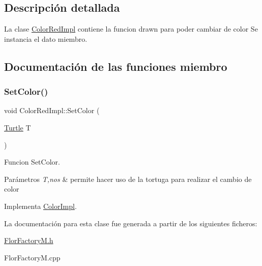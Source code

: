 \subsection{Descripción detallada}
La clase \hyperlink{classColorRedImpl}{Color\+Red\+Impl} contiene la funcion drawn para poder cambiar de color  Se instancia el dato miembro. 

\subsection{Documentación de las funciones miembro}
\mbox{\label{classColorRedImpl_ab094a64f146cc3b6abeea2b60a289f49}} 
\subsubsection{\texorpdfstring{Set\+Color()}{SetColor()}}
{\footnotesize\ttfamily void Color\+Red\+Impl\+::\+Set\+Color (\begin{DoxyParamCaption}\item[{\hyperlink{classTurtle}{Turtle}}]{T }\end{DoxyParamCaption})\hspace{0.3cm}{\ttfamily [virtual]}}

Funcion Set\+Color. 
\begin{DoxyParams}{Parámetros}
{\em T,nos} & permite hacer uso de la tortuga para realizar el cambio de color \\
\hline
\end{DoxyParams}


Implementa \hyperlink{classColorImpl_a25bf353d46c94dc280eced8d7d566825}{Color\+Impl}.



La documentación para esta clase fue generada a partir de los siguientes ficheros\+:\begin{DoxyCompactItemize}
\item 
\hyperlink{FlorFactoryM_8h}{Flor\+Factory\+M.\+h}\item 
Flor\+Factory\+M.\+cpp\end{DoxyCompactItemize}
